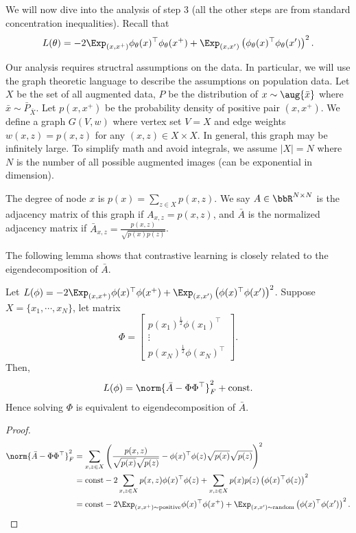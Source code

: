 We will now dive into the analysis of step 3 (all the other steps are from standard concentration inequalities). Recall that 
\begin{align}
		L(\theta)  = -2\Exp_{(x, x^+) } \phi_{{\theta}}(x)^\top \phi_{{\theta}}(x^+) + \Exp_{(x, x') }  \left(\phi_{{\theta}}(x)^\top \phi_{{\theta}}(x')\right)^2.
\end{align}

Our analysis requires structral assumptions on the data. In particular, we will use the graph theoretic language to describe the assumptions on population data. Let $X$ be the set of all augmented data, $P$ be the distribution of $x\sim\aug{\bar{x}}$ where $\bar{x}\sim\bar{P}_{\bar{X}}$. Let $p(x, x^+)$ be the probability density of positive pair $(x, x^+)$. We define a graph $G(V, w)$ where vertex set $V=X$ and edge weights $w(x, z) = p(x, z)$ for any $(x, z) \in X\times X$. In general, this graph may be infinitely large. To simplify math and avoid integrals, we assume $|X|=N$ where $N$ is the number of all possible augmented images (can be exponential in dimension). 

The degree of node $x$ is $p(x) = \sum_{z\in X} p(x, z)$.  We say $A\in\bbR^{N\times N}$ is the adjacency matrix of this graph if $A_{x, z} = p(x, z)$, and $\bar{A}$ is the normalized adjacency matrix if $\bar{A}_{x, z} = \frac{p(x, z)}{\sqrt{p(x)p(z)}}$. 

The following lemma shows that contrastive learning is closely related to the eigendecomposition of $\bar{A}$. 
\begin{lemma}
	Let $L(\phi) = -2\Exp_{(x, x^+) } \phi(x)^\top \phi(x^+) + \Exp_{(x, x') } \left(\phi(x)^\top \phi(x')\right)^2$.  Suppose $X=\{x_1, \cdots, x_N\}$, let matrix 
	\begin{equation}
	    \Phi = \begin{bmatrix}  p(x_1)^{\frac{1}{2}} \phi(x_1)^\top  \\ \vdots \\  p(x_N)^{\frac{1}{2}} \phi(x_N)^\top \end{bmatrix}.
	\end{equation}
	Then,
	\begin{align}
		L(\phi) = \norm{\bar{A}-\Phi\Phi^\top}_F^2 +\text{const}.
	\end{align}
	Hence solving $\Phi$ is equivalent to eigendecomposition of $\bar{A}$. 
\end{lemma}
\begin{proof}
\begin{align}
	\norm{\bar{A} - \Phi\Phi^\top}_F^2 &= \sum_{x, z\in X} \left(\frac{p(x, z)}{\sqrt{p(x)}\sqrt{p(z)}} - \phi(x)^\top \phi(z) \sqrt{p(x)}\sqrt{p(z)}\right)^2\\
	&= \text{const} -2 \sum_{x, z\in X} p(x, z) \phi(x)^\top \phi(z) + \sum_{x, z\in X}p(x)p(z)\left(\phi(x)^\top \phi(z)\right)^2\\
	&= \text{const} -2\Exp_{(x, x^+) \sim\text{positive}} \phi(x)^\top \phi(x^+) + \Exp_{(x, x') \sim\text{random}}  \left(\phi(x)^\top \phi(x')\right)^2.
\end{align}
\end{proof}

